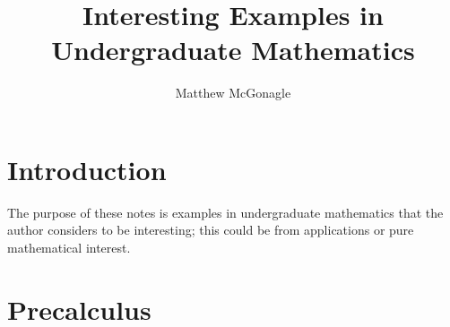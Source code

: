 \documentclass{article}
\title{Interesting Examples in Undergraduate Mathematics}
\author{Matthew McGonagle}
\begin{document}
\maketitle

\tableofcontents

\section{Introduction}

The purpose of these notes is examples in undergraduate mathematics that the author considers to be interesting; this could be from applications or pure mathematical interest. 

\section{Precalculus}









{}

\end{document}
